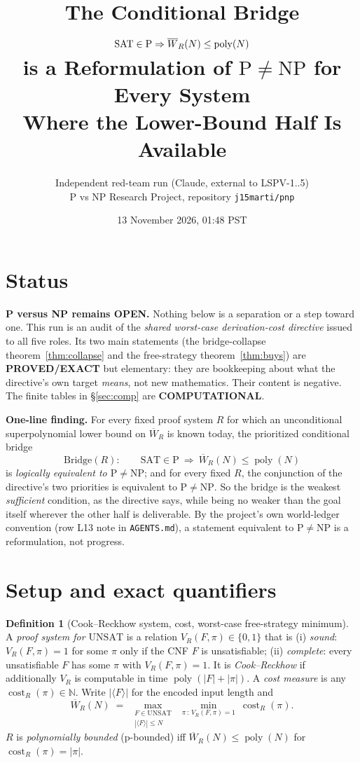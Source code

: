 \documentclass[11pt]{article}
\title{The Conditional Bridge $\mathrm{SAT}\in\mathrm P\Rightarrow\Wbar_R(N)\le\poly(N)$\\
is a Reformulation of $\mathrm P\neq\mathrm{NP}$ for Every System\\
Where the Lower-Bound Half Is Available}
\author{Independent red-team run (Claude, external to LSPV-1..5)\\
P vs NP Research Project, repository \texttt{j15marti/pnp}}
\date{13 November 2026, 01:48 PST}
\theoremstyle{definition}
\newtheorem{definition}[theorem]{Definition}
\newcommand{\poly}{\operatorname{poly}}
\newcommand{\cost}{\operatorname{cost}}
\newcommand{\UNSAT}{\mathrm{UNSAT}}
\newcommand{\Wbar}{\overline W}
\begin{document}
\maketitle

\section*{Status}
\textbf{P versus NP remains OPEN.} Nothing below is a separation or a step
toward one. This run is an audit of the \emph{shared worst-case derivation-cost
directive} issued to all five roles. Its two main statements
(the bridge-collapse theorem~\ref{thm:collapse} and the
free-strategy theorem~\ref{thm:buys}) are \textbf{PROVED/EXACT} but
elementary: they are bookkeeping about what the directive's own target
\emph{means}, not new mathematics. Their content is negative. The finite
tables in \S\ref{sec:comp} are \textbf{COMPUTATIONAL}.

\medskip\noindent\textbf{One-line finding.} For every fixed proof system $R$
for which an unconditional superpolynomial lower bound on
$\Wbar_R$ is known today, the prioritized conditional bridge
\[
  \mathrm{Bridge}(R):\qquad
  \mathrm{SAT}\in\mathrm P\ \Longrightarrow\ \Wbar_R(N)\le\poly(N)
\]
is \emph{logically equivalent to $\mathrm P\neq\mathrm{NP}$}; and for every
fixed $R$, the conjunction of the directive's two priorities is equivalent to
$\mathrm P\neq\mathrm{NP}$. So the bridge is the weakest \emph{sufficient}
condition, as the directive says, while being no weaker than the goal itself
wherever the other half is deliverable. By the project's own world-ledger
convention (row L13 note in \texttt{AGENTS.md}), a statement equivalent to
$\mathrm P\neq\mathrm{NP}$ is a reformulation, not progress.

\section{Setup and exact quantifiers}

\begin{definition}[Cook--Reckhow system, cost, worst-case free-strategy minimum]
\label{def:cr}
A \emph{proof system for $\UNSAT$} is a relation $V_R(F,\pi)\in\{0,1\}$ that is
(i) \emph{sound}: $V_R(F,\pi)=1$ for some $\pi$ only if the CNF $F$ is
unsatisfiable; (ii) \emph{complete}: every unsatisfiable $F$ has some $\pi$
with $V_R(F,\pi)=1$. It is \emph{Cook--Reckhow} if additionally $V_R$ is
computable in time $\poly(|F|+|\pi|)$. A \emph{cost measure} is any
$\cost_R(\pi)\in\mathbb N$. Write $|\langle F\rangle|$ for the encoded input
length and
\[
 \Wbar_R(N)\;=\;\max_{\substack{F\in\UNSAT\\ |\langle F\rangle|\le N}}
 \ \min_{\pi\,:\,V_R(F,\pi)=1}\ \cost_R(\pi).
\]
$R$ is \emph{polynomially bounded} (p-bounded) iff $\Wbar_R(N)\le\poly(N)$ for
$\cost_R(\pi)=|\pi|$.
\end{definition}
\end{document}
